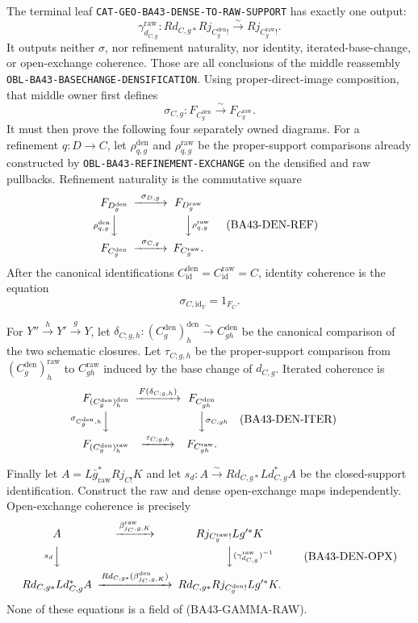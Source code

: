 The terminal leaf \texttt{CAT-GEO-BA43-DENSE-TO-RAW-SUPPORT} has exactly one
output:
\[
 \gamma^{\mathrm{raw}}_{d_{C,g}}:
 Rd_{C,g*}Rj_{C_g^{\mathrm{den}}!}
 \xrightarrow{\sim}Rj_{C_g^{\mathrm{raw}}!}.
\tag{BA43-GAMMA-RAW}
\]
It outputs neither $\sigma$, nor refinement naturality, nor identity,
iterated-base-change, or open-exchange coherence.  Those are all conclusions
of the middle reassembly \texttt{OBL-BA43-BASECHANGE-DENSIFICATION}.  Using
proper-direct-image composition, that middle owner first defines
\[
 \sigma_{C,g}:F_{C_g^{\mathrm{den}}}
 \xrightarrow{\sim}F_{C_g^{\mathrm{raw}}}.
\tag{BA43-SIGMA}
\]
It must then prove the following four separately owned diagrams.  For a
refinement $q:D\to C$, let $\rho^{\mathrm{den}}_{q,g}$ and
$\rho^{\mathrm{raw}}_{q,g}$ be the proper-support comparisons already
constructed by \texttt{OBL-BA43-REFINEMENT-EXCHANGE} on the densified and raw
pullbacks.  Refinement naturality is the
commutative square
\[
\begin{CD}
 F_{D_g^{\mathrm{den}}} @>{\sigma_{D,g}}>> F_{D_g^{\mathrm{raw}}}\\
 @V{\rho^{\mathrm{den}}_{q,g}}VV @VV{\rho^{\mathrm{raw}}_{q,g}}V\\
 F_{C_g^{\mathrm{den}}} @>{\sigma_{C,g}}>> F_{C_g^{\mathrm{raw}}}.
\end{CD}
\tag{BA43-DEN-REF}
\]
After the canonical identifications
$C_{\mathrm{id}}^{\mathrm{den}}=C_{\mathrm{id}}^{\mathrm{raw}}=C$, identity
coherence is the equation
\[
 \sigma_{C,\mathrm{id}_Y}=1_{F_C}.
 \tag{BA43-DEN-ID}
\]

For $Y''\xrightarrow{h}Y'\xrightarrow{g}Y$, let
$\delta_{C;g,h}:(C_g^{\mathrm{den}})_h^{\mathrm{den}}
\xrightarrow{\sim}C_{gh}^{\mathrm{den}}$ be the canonical comparison of the
two schematic closures.  Let $\tau_{C;g,h}$ be the proper-support comparison
from $(C_g^{\mathrm{den}})_h^{\mathrm{raw}}$ to $C_{gh}^{\mathrm{raw}}$
induced by the base change of $d_{C,g}$.  Iterated coherence is
\[
\begin{CD}
 F_{(C_g^{\mathrm{den}})_h^{\mathrm{den}}}
   @>{F(\delta_{C;g,h})}>> F_{C_{gh}^{\mathrm{den}}}\\
 @V{\sigma_{C_g^{\mathrm{den}},h}}VV @VV{\sigma_{C,gh}}V\\
 F_{(C_g^{\mathrm{den}})_h^{\mathrm{raw}}}
   @>{\tau_{C;g,h}}>> F_{C_{gh}^{\mathrm{raw}}}.
\end{CD}
\tag{BA43-DEN-ITER}
\]

Finally let
$A=L\bar g_{\mathrm{raw}}^*Rj_{C!}K$ and let
$s_d:A\xrightarrow{\sim}Rd_{C,g*}Ld_{C,g}^*A$ be the closed-support
identification.  Construct the raw and dense open-exchange maps independently.
Open-exchange coherence is precisely
\[
\begin{CD}
 A @>{\beta^{\mathrm{raw}}_{j_C,g,K}}>>
     Rj_{C_g^{\mathrm{raw}}!}Lg'^*K\\
 @V{s_d}VV @VV{(\gamma^{\mathrm{raw}}_{d_{C,g}})^{-1}}V\\
 Rd_{C,g*}Ld_{C,g}^*A
 @>{Rd_{C,g*}(\beta^{\mathrm{den}}_{j_C,g,K})}>>
 Rd_{C,g*}Rj_{C_g^{\mathrm{den}}!}Lg'^*K.
\end{CD}
\tag{BA43-DEN-OPX}
\]
None of these equations is a field of \textup{(BA43-GAMMA-RAW)}.

